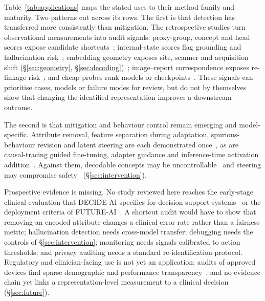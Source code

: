 Table~\ref{tab:applications} maps the stated uses to their method family and maturity. Two patterns cut across its rows. The first is that detection has transferred more consistently than
mitigation. The retrospective
studies turn observational measurements into audit signals: proxy-group, concept and head scores expose
candidate shortcuts~\cite{queiroz2024using,bahre2025underdiagnosis,bhattacharyya2025conformal,brown2022detecting,yang2024the,yasser2026locating};
internal-state scores flag grounding and hallucination
risk~\cite{hardy2024rextrust,yu2026realtime,li2025the,kossen2024semantic}; embedding geometry exposes
site, scanner and acquisition shift
(\S\ref{sec:geometry}, \S\ref{sec:decoding})~\cite{mishra2025comparing,schulthess2025anomaly};
image--report correspondence exposes re-linkage risk~\cite{tonekaboni2025an,nasirigerdeh2024machine};
and cheap probes rank models or checkpoints~\cite{liang2026cheap,chen2025revisiting}. These signals can
prioritise cases, models or failure modes for review, but do not by themselves show that changing the
identified representation improves a downstream outcome.

The second is that mitigation and behaviour control remain emerging and model-specific. Attribute removal, feature
separation during adaptation, spurious-behaviour revision and latent steering are each demonstrated
once~\cite{zheng2025towards,huang2025knowledgeguided,pahde2025ensuring,ahsan2025can}, as are
causal-tracing guided fine-tuning, adapter guidance and inference-time activation
addition~\cite{abbasi2026layerspecific,sadanandan2026mechanistically,farina2026translating}. Against
them, decodable concepts may be uncontrollable~\cite{basu2026interpretability} and steering may
compromise safety~\cite{korznikov2025the,li2026analysing} (\S\ref{sec:intervention}).

Prospective evidence is missing. No study reviewed here reaches the early-stage clinical evaluation that
DECIDE-AI specifies for decision-support systems~\cite{vasey2022decide} or the deployment criteria of
FUTURE-AI~\cite{lekadir2023future}. A shortcut audit would have to show that removing an encoded
attribute changes a clinical error rate rather than a fairness metric; hallucination detection needs
cross-model transfer; debugging needs the controls of \S\ref{sec:intervention}; monitoring needs signals
calibrated to action thresholds; and privacy auditing needs a standard re-identification protocol.
Regulatory and clinician-facing use is not yet an application: audits of approved devices find
sparse demographic and performance
transparency~\cite{muralidharan2024a,mehta2025evaluating,warraich2024fda}, and no evidence chain yet
links a representation-level measurement to a clinical decision (\S\ref{sec:future}).
